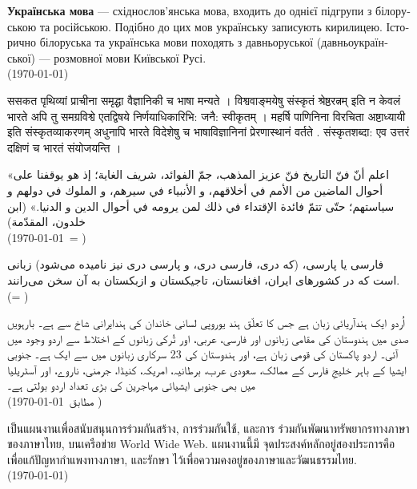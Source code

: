 \documentclass[a4paper]{article}
\begin{document}
\begin{ukrainian}
  \textbf{Українська мова} — східнослов'янська мова, входить до однієї підгрупи з білоруською та російською. Подібно до цих мов українську записують кирилицею. Історично білоруська та українська мови походять з давньоруської (давньоукраїнської) — розмовної мови Київської Русі.\\
  (\today)
\end{ukrainian}

\begin{sanskrit}
  {\Large ससकत} पृथिव्यां प्राचीना समृद्घा वैज्ञानिकी च भाषा मन्यते । विश्ववाङ्‌मयेषु संस्कृतं श्रेष्ठरत्नम् इति न केवलं भारते अपि तु समग्रविश्वे एतद्विषये निर्णयाधिकारिभि: जनै: स्वीकृतम् । महर्षि पाणिनिना विरचिता अष्टाध्यायी इति संस्कृतव्याकरणम्‌ अधुनापि भारते विदेशेषु च भाषाविज्ञानिनां प्रेरणास्‍थानं वर्तते . संस्कृतशब्दा: एव उत्तरं दक्षिणं च भारतं संयोजयन्ति ।
\end{sanskrit}

\begin{Arabic}[]
  «اعلم أنّ فنّ التاريخ فنّ عزيز المذهب، جمّ الفوائد، شريف الغاية؛ إذ هو يوقفنا على أحوال الماضين من الأمم في أخلاقهم، و الأنبياء في سيرهم، و الملوك في دولهم و سياستهم؛ حتّى تتمّ فائدة الإقتداء في ذلك لمن يرومه في أحوال الدين و الدنيا.» (ابن خلدون، المقدّمة)\\
  (\today\ = \Hijritoday[0])
\end{Arabic}

\begin{farsi}
  فارسی یا پارسی، (که دری، فارسی دری، و پارسی دری نیز نامیده می‌شود) زبانی است که
  در کشورهای ایران، افغانستان، تاجیکستان و ازبکستان به آن سخن می‌رانند. \\
  (\Jalalitoday = \Hijritoday)
\end{farsi}

\pagebreak
\begin{urdu}
  اُردو ایک ہندآریائی زبان ہے جس کا تعلّق ہند یوروپی لسانی خاندان کی ہندایرانی شاخ سے ہے۔ بارہویں صدی میں ہندوستان کی مقامی زبانوں اور فارسی، عربی، اور تُرکی زبانوں کے اختلاط سے اردو وجود میں آئی۔ اردو پاکستان کی قومی زبان ہے، اور ہندوستان کی 23 سرکاری زبانوں میں سے ایک ہے۔ جنوبی ایشیا کے باہر خلیجِ فارس کے ممالک، سعودی عرب، برطانیہ، امریکہ، کنیڈا، جرمنی، ناروے، اور آسٹریلیا میں بھی جنوبی ایشیائی مہاجرین کی بڑی تعداد اردو بولتی ہے۔ \\

  (\today\ مطابق \Hijritoday[0])
\end{urdu}

\begin{thai}
  เป็น\wbr แผนงานเพื่อ\wbr สนับสนุน\wbr การ\wbr ร่วมกัน\wbr สร้าง, การ\wbr ร่วมกันใช้, และ\wbr การ%
  ร่วมกัน\wbr พัฒนา\wbr ทรัพยากร\wbr ทาง\wbr ภาษา\wbr ของ\wbr ภาษา\wbr ไทย, บน\wbr เครือข่าย World Wide Web. แผนงานนี้\wbr มี%
  จุด\wbr ประสงค์หลั\wbr กอยู่\wbr สอง\wbr ประการคือ เพื่อแก้ปัญหา\wbr กำ\wbr แพง\wbr ทาง\wbr ภาษา, และรักษา%
  ไว้เพื่อ\wbr ความค\wbr งอยู่\wbr ของ\wbr ภาษา\wbr และ\wbr วัฒนธรรม\wbr ไทย. \\
  (\today)
\end{thai}
\end{document}
